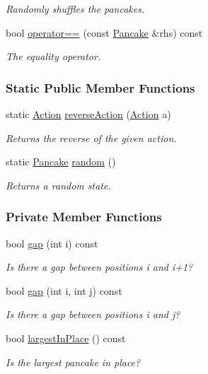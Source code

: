 \begin{DoxyCompactItemize}
\begin{DoxyCompactList}\small\item\em Randomly shuffles the pancakes. \end{DoxyCompactList}\item 
bool \hyperlink{structpancake_1_1Pancake_a4fa8d6622c7d3b524d7bf3e874cbc535}{operator==} (const \hyperlink{structpancake_1_1Pancake}{Pancake} \&rhs) const 
\begin{DoxyCompactList}\small\item\em The equality operator. \end{DoxyCompactList}\end{DoxyCompactItemize}
\subsubsection*{Static Public Member Functions}
\begin{DoxyCompactItemize}
\item 
static \hyperlink{structpancake_1_1Pancake_aad1b4a78f22485b896ac7e89aed5f099}{Action} \hyperlink{structpancake_1_1Pancake_a73c3da3aba068e881214cb5c80a2d78a}{reverse\+Action} (\hyperlink{structpancake_1_1Pancake_aad1b4a78f22485b896ac7e89aed5f099}{Action} a)
\begin{DoxyCompactList}\small\item\em Returns the reverse of the given action. \end{DoxyCompactList}\item 
static \hyperlink{structpancake_1_1Pancake}{Pancake} \hyperlink{structpancake_1_1Pancake_a1e7894453c2e97f1f75a6660e544d2ab}{random} ()
\begin{DoxyCompactList}\small\item\em Returns a random state. \end{DoxyCompactList}\end{DoxyCompactItemize}
\subsubsection*{Private Member Functions}
\begin{DoxyCompactItemize}
\item 
bool \hyperlink{structpancake_1_1Pancake_ace583fab3f010812399dbd684d463306}{gap} (int i) const 
\begin{DoxyCompactList}\small\item\em Is there a gap between positions i and i+1? \end{DoxyCompactList}\item 
bool \hyperlink{structpancake_1_1Pancake_a1186c7caaaf4952a4a81b63793a1cda9}{gap} (int i, int j) const 
\begin{DoxyCompactList}\small\item\em Is there a gap between positions i and j? \end{DoxyCompactList}\item 
bool \hyperlink{structpancake_1_1Pancake_aa3812cb5156592fd5099dfef547f43ff}{largest\+In\+Place} () const 
\begin{DoxyCompactList}\small\item\em Is the largest pancake in place? \end{DoxyCompactList}\end{DoxyCompactItemize}

